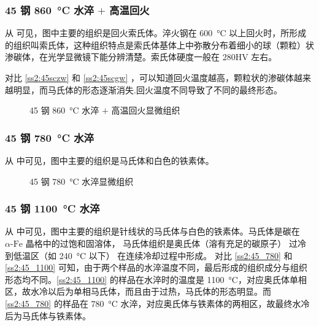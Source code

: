 \documentclass[a4paper,utf8]{article}
\begin{document}
    \subsubsection{45 钢 \SI{860}{\degreeCelsius} 水淬 $+$ 高温回火\label{ss2:45scgw}}
    从 可见，图中主要的组织是回火索氏体。淬火钢在 \SI{600}{\degreeCelsius} 以上回火时，所形成的组织叫索氏体，这种组织特点是索氏体基体上中弥散分布着细小的球（颗粒）状渗碳体，在光学显微镜下能分辨清楚。索氏体硬度一般在 280HV 左右。\par
    对比 \ref{ss2:45sczw} 和 \ref{ss2:45scgw} ，可以知道回火温度越高，颗粒状的渗碳体越来越明显，而马氏体的形态逐渐消失.回火温度不同导致了不同的最终形态。
    \begin{figure}[!ht]
        \hspace{20pt}
        \caption{45 钢 \SI{860}{\degreeCelsius} 水淬 $+$ 高温回火显微组织\label{fig:n9}}
    \end{figure}

    \subsubsection{45 钢 \SI{780}{\degreeCelsius} 水淬\label{ss2:45_780}}
    从 中可见，图中主要的组织是马氏体和白色的铁素体。
    \begin{figure}[!ht]
        \hspace{20pt}
        \caption{45 钢 \SI{780}{\degreeCelsius} 水淬显微组织\label{fig:n10}}
    \end{figure}

    \subsubsection{45 钢 \SI{1100}{\degreeCelsius} 水淬\label{ss2:45_1100}}
    从 中可见，图中主要的组织是针线状的马氏体与白色的铁素体。马氏体是碳在$\alpha\text{-Fe}$ 晶格中的过饱和固溶体， 马氏体组织是奥氏体（溶有充足的碳原子） 过冷到低温区（如 \SI{240}{\degreeCelsius} 以下） 在连续冷却过程中形成。
	对比 \ref{ss2:45_780} 和 \ref{ss2:45_1100} 可知，由于两个样品的水淬温度不同，最后形成的组织成分与组织形态均不同。\ref{ss2:45_1100} 的样品在水淬时的温度是 \SI{1100}{\degreeCelsius}，对应奥氏体单相区，故水冷以后为单相马氏体，而且由于过热，马氏体的形态明显。而 \ref{ss2:45_780} 的样品在 \SI{780}{\degreeCelsius} 水淬，对应奥氏体与铁素体的两相区，故最终水冷后为马氏体与铁素体。
\end{document}
